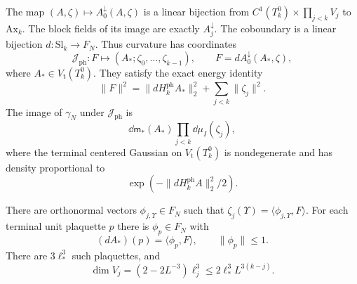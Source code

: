 \begin{proposition}\label{prop:term-photon-tower}
The map $(A,\zeta)\mapsto A_0^\downarrow(A,\zeta)$
is a linear bijection from
$C^1(T_k^0)\times\prod_{j<k}V_j$ to $\mathrm{Ax}_k$.
The block fields of its image are exactly
$A_j^\downarrow$.
The coboundary is a linear bijection
$d:\mathrm{Sl}_k\to F_N$.
Thus curvature has coordinates
\begin{equation}\label{eq:term-curvature-coordinates}
 \mathcal J_{\mathrm{ph}}:
 F\longmapsto(A_*;\zeta_0,\ldots,\zeta_{k-1}),\qquad
 F=dA_0^\downarrow(A_*,\zeta),
\end{equation}
where $A_*\in V_{\mathrm t}(T_k^0)$.
They satisfy the exact energy identity
\begin{equation}\label{eq:term-tower-energy}
 \|F\|^2=\|dH_k^{\mathrm{ph}}A_*\|_2^2
                                  +\sum_{j<k}\|\zeta_j\|^2 .
\end{equation}
The image of $\gamma_N$ under
$\mathcal J_{\mathrm{ph}}$ is
\begin{equation}\label{eq:term-tower-Gaussian}
                  \dd\mathsf m_*(A_*)\prod_{j<k}\dd\mu_I(\zeta_j),
\end{equation}
where the terminal centered Gaussian on
$V_{\mathrm t}(T_k^0)$ is nondegenerate and has density
proportional to
\[
                  \exp(-\|dH_k^{\mathrm{ph}}A\|_2^2/2).
\]

There are orthonormal vectors
$\phi_{j,\Upsilon}\in F_N$ such that
$\zeta_j(\Upsilon)=\langle\phi_{j,\Upsilon},F\rangle$.
For each terminal unit plaquette $p$ there is
$\phi_p\in F_N$ with
\begin{equation}\label{eq:term-tower-row-norms}
 (dA_*)(p)=\langle\phi_p,F\rangle,\qquad \|\phi_p\|\le1.
\end{equation}
There are $3\ell_*^3$ such plaquettes, and
\begin{equation}\label{eq:term-tower-coordinate-count}
 \dim V_j=(2-2L^{-3})\ell_j^3
                       \le2\ell_*^3L^{3(k-j)} .
\end{equation}
\end{proposition}

